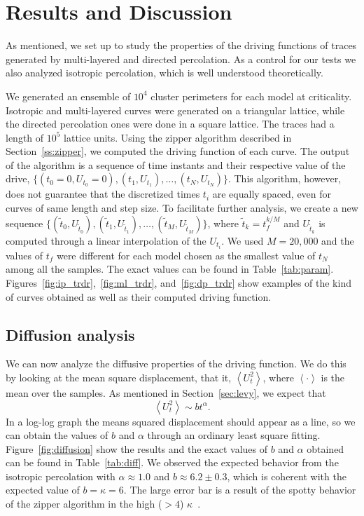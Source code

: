 \section{Results and Discussion}
\label{sec:scaling}

As mentioned, we set up to study the properties of the driving functions of
traces generated by multi-layered and directed percolation. As a control for
our tests we also analyzed isotropic percolation, which is well understood
theoretically.

We generated an ensemble of $10^4$ cluster perimeters for each model at
criticality. Isotropic and multi-layered curves were generated on a triangular
lattice, while the directed percolation ones were done in a square lattice. The
traces had a length of $10^5$ lattice units. Using the zipper algorithm
described in Section~\ref{ss:zipper}, we computed the driving function of each
curve. The output of the algorithm is a sequence of time instants and their
respective value of the drive, $\{(t_0=0, U_{t_0}=0), (t_1, U_{t_1}), \ldots,
(t_N, U_{t_N})\}$. This algorithm, however, does not guarantee that the
discretized times $t_i$ are equally spaced, even for curves of same length and
step size. To facilitate further analysis, we create a new sequence
$\{(\tilde{t}_{0}, U_{\tilde{t}_{0}}), (\tilde{t}_{1}, U_{\tilde{t}_{1}}),
\ldots, (\tilde{t}_{M}, U_{\tilde{t}_{M}})\}$, where $\tilde{t}_k = t_f^{k/M}$
and $U_{\tilde{t}_k}$ is computed through a linear interpolation of the
$U_{t_i}$. We used $M=20,000$ and the values of $t_f$ were different for each
model chosen as the smallest value of $t_N$ among all the samples. The exact
values can be found in Table~\ref{tab:param}.
Figures~\ref{fig:ip_trdr},~\ref{fig:ml_trdr}, and~\ref{fig:dp_trdr} show
examples of the kind of curves obtained as well as their computed driving
function.

\subsection{Diffusion analysis}
\label{sec:dif}

We can now analyze the diffusive properties of the driving function. We do this
by looking at the mean square displacement, that it, $\left\langle U_t^2
\right\rangle$, where $\left\langle\cdot\right\rangle$ is the mean over the
samples. As mentioned in Section~\ref{sec:levy}, we expect that
\begin{equation}
    \left\langle U_t^2 \right\rangle\sim bt^\alpha.
\end{equation}
In a log-log graph the means squared displacement should appear as a line, so
we can obtain the values of $b$ and $\alpha$ through an ordinary least square
fitting. Figure~\ref{fig:diffusion} show the results and the exact values of
$b$ and $\alpha$ obtained can be found in Table~\ref{tab:diff}. We observed the
expected behavior from the isotropic percolation with $\alpha\approx1.0$ and
$b\approx6.2\pm0.3$, which is coherent with the expected value of $b=\kappa=6$.
The large error bar is a result of the spotty behavior of the zipper algorithm
in the high ($>4$) $\kappa$~\cite{Kennedy2007}.

